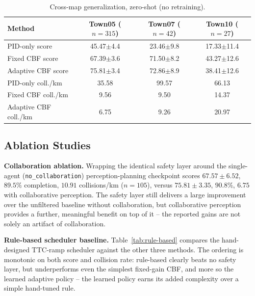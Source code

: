 \begin{table}[!htbp]
\centering
\caption{Cross-map generalization, zero-shot (no retraining).}
\label{tab:generalization}
{\scriptsize
\setlength{\tabcolsep}{4pt}
\begin{tabular}{lccc}
\toprule
Method & Town05 ($n{=}315$) & Town07 ($n{=}42$) & Town10 ($n{=}27$) \\
\midrule
PID-only score      & 45.47$\pm$4.4  & 23.46$\pm$9.8 & 17.33$\pm$11.4 \\
Fixed CBF score      & 67.39$\pm$3.6  & 71.50$\pm$8.2 & 43.27$\pm$12.6 \\
Adaptive CBF score   & 75.81$\pm$3.4  & 72.86$\pm$8.9 & 38.41$\pm$12.6 \\
\midrule
PID-only coll./km    & 35.58 & 99.57 & 66.13 \\
Fixed CBF coll./km   & 9.56  & 9.50  & 14.37 \\
Adaptive CBF coll./km& 6.75  & 9.26  & 20.97 \\
\bottomrule
\end{tabular} }
\end{table}

\subsection{Ablation Studies}
\label{sec:ablations}

\textbf{Collaboration ablation.} Wrapping the identical safety layer around the single-agent (\texttt{no\_collaboration}) perception-planning checkpoint scores $67.57\pm6.52$, $89.5\%$ completion, $10.91$ collisions/km ($n{=}105$), versus $75.81\pm3.35$, $90.8\%$, $6.75$ with collaborative perception. The safety layer still delivers a large improvement over the unfiltered baseline without collaboration, but collaborative perception provides a further, meaningful benefit on top of it -- the reported gains are not solely an artifact of collaboration.

\textbf{Rule-based scheduler baseline.} Table~\ref{tab:rule-based} compares the hand-designed TTC-ramp scheduler against the other three methods. The ordering is monotonic on both score and collision rate: rule-based clearly beats no safety layer, but underperforms even the simplest fixed-gain CBF, and more so the learned adaptive policy -- the learned policy earns its added complexity over a simple hand-tuned rule.

